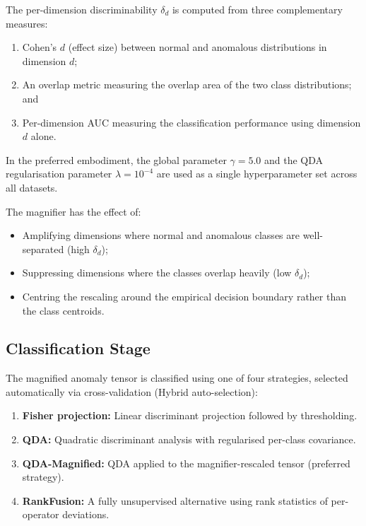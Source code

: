 \documentclass[12pt,a4paper]{article}
\begin{document}
The per-dimension discriminability $\delta_d$ is computed from three 
complementary measures:
\begin{enumerate}
\item Cohen's $d$ (effect size) between normal and anomalous distributions 
in dimension $d$;
\item An overlap metric measuring the overlap area of the two class 
distributions; and
\item Per-dimension AUC measuring the classification performance using 
dimension $d$ alone.
\end{enumerate}

In the preferred embodiment, the global parameter $\gamma = 5.0$ and the 
QDA regularisation parameter $\lambda = 10^{-4}$ are used as a single 
hyperparameter set across all datasets.

The magnifier has the effect of:
\begin{itemize}
\item Amplifying dimensions where normal and anomalous classes are 
well-separated (high $\delta_d$);
\item Suppressing dimensions where the classes overlap heavily (low 
$\delta_d$);
\item Centring the rescaling around the empirical decision boundary rather 
than the class centroids.
\end{itemize}

\subsection{Classification Stage}

The magnified anomaly tensor is classified using one of four strategies, 
selected automatically via cross-validation (Hybrid auto-selection):

\begin{enumerate}[label=(\alph*)]
\item \textbf{Fisher projection:} Linear discriminant projection followed by 
thresholding.
\item \textbf{QDA:} Quadratic discriminant analysis with regularised 
per-class covariance.
\item \textbf{QDA-Magnified:} QDA applied to the magnifier-rescaled tensor 
(preferred strategy).
\item \textbf{RankFusion:} A fully unsupervised alternative using rank 
statistics of per-operator deviations.
\end{enumerate}
\end{document}
